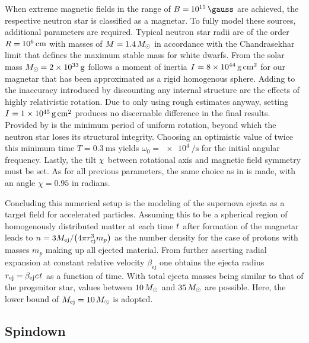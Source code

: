 When extreme magnetic fields in the range of $B = \kern-0.5pt \qty{e15}{\gauss}$ are achieved, the respective neutron star is
classified as a magnetar. To fully model these sources, additional parameters are required. Typical neutron star radii are of the
order $R = \kern-0.5pt \qty{e6}{\centi\meter}$ with masses of $M = \num{1.4} \kern+1.5pt M_\odot$ in accordance with the Chandrasekhar
limit that defines the maximum stable mass for white dwarfs. From the solar mass $M_\odot \kern-0.75pt = \qty{2e33}{\gram}$ follows
a moment of inertia $I \kern+0.5pt = \qty{8e44}{\gram\centi\meter\squared}$ for our magnetar that has been approximated as a rigid
homogenous sphere. Adding to the inaccuracy introduced by discounting any internal structure are the effects of highly relativistic
rotation. Due to only using rough estimates anyway, setting $\cramped{I \kern+0.5pt = \qty{1e45}{\gram\centi\meter\squared}}$ produces no
discernable difference in the final results. Provided by \cite{Haensel_1999} is the minimum period of uniform rotation, beyond
which the neutron star loses its structural integrity. Choosing an optimistic value of twice this minimum time $T = \qty{0.3}{\milli\second}$
yields $\omega_0 = \qty{e4}{\per\second}$ for the initial angular frequency. Lastly, the tilt $\kern-0.5pt \chi \kern+0.5pt$
between rotational axis and magnetic field symmetry must be set. As for all previous parameters, the same choice as in
\cite{Carpio_2020} is made, with an angle $\chi = \num{0.95}$ in radians.

Concluding this numerical setup is the modeling of the supernova ejecta as a target field for accelerated particles. Assuming
this to be a spherical region of homogenously distributed matter at each time $t \kern+0.5pt$ after formation of the magnetar
leads to $\cramped{n = 3 M_\text{ej} / \bigl( 4\pi r_\text{ej}^3 m_p \bigr)} \kern+0.5pt$ as the number density for the case of
protons with masses $m_p$ making up all ejected material. From further asserting radial expansion at constant relative velocity
$\beta_\text{ej}$ one obtains the ejecta radius $r_\text{ej} = \kern-0.4pt \beta_\text{ej} \kern+0.1pt c \kern+1.0pt t \kern+0.5pt$
as a function of time. With total ejecta masses being similar to that of the progenitor star, values between $\num{10} \kern+1.5pt M_\odot$
and $\num{35} \kern+1.5pt M_\odot$ are possible. Here, the lower bound of $M_\text{ej} = \num{10} \kern+1.5pt M_\odot$ is adopted.



\subsection{Spindown}
\label{sub:spindown}

